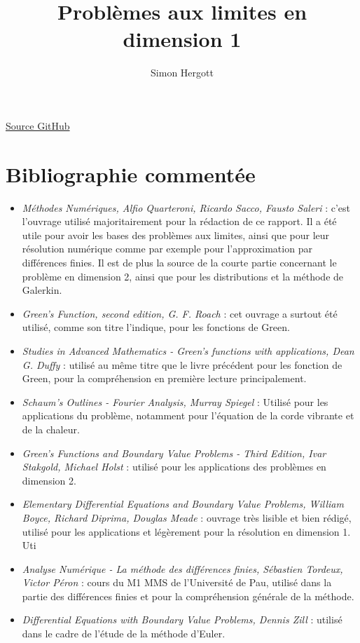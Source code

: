 \documentclass[12pt]{article}
\title{Problèmes aux limites en dimension 1} %
\author{Simon Hergott} %
\begin{document}
	\maketitle
\begin{center}
\href{https://github.com/FumedSaumonSauvage/TIPEpbLimDim1}{Source GitHub}
\end{center}


\pagebreak

\tableofcontents

\pagebreak

\section{Bibliographie commentée}


\begin{itemize}
  \item[] \emph{Méthodes Numériques, Alfio Quarteroni, Ricardo Sacco, Fausto Saleri} : c'est l'ouvrage utilisé majoritairement pour la rédaction de ce rapport. Il a été utile pour avoir les bases des problèmes aux limites, ainsi que pour leur résolution numérique comme par exemple pour l'approximation par différences finies. Il est de plus la source de la courte partie concernant le problème en dimension 2, ainsi que pour les distributions et la méthode de Galerkin.
  \item[] \emph{Green's Function, second edition, G. F. Roach} : cet ouvrage a surtout été utilisé, comme son titre l'indique, pour les fonctions de Green.
  \item[] \emph{Studies in Advanced Mathematics - Green's functions with applications,  Dean G. Duffy} : utilisé au même titre que le livre précédent pour les fonction de Green, pour la compréhension en première lecture principalement.
  \item[] \emph{Schaum's Outlines - Fourier Analysis, Murray Spiegel} : Utilisé pour les applications du problème, notamment pour l'équation de la corde vibrante et de la chaleur.
  \item[] \emph{Green's Functions and Boundary Value Problems - Third Edition, Ivar Stakgold, Michael Holst} : utilisé pour les applications des problèmes en dimension 2.
  \item[] \emph{Elementary Differential Equations and Boundary Value Problems, William Boyce, Richard Diprima, Douglas Meade} : ouvrage très lisible et bien rédigé, utilisé pour les applications et légèrement pour la résolution en dimension 1. Uti
  \item[] \emph{Analyse Numérique - La méthode des différences finies, Sébastien Tordeux, Victor Péron} : cours du M1 MMS de l'Université de Pau, utilisé dans la partie des différences finies et pour la compréhension générale de la méthode.
\item[] \emph{Differential Equations with Boundary Value Problems, Dennis Zill} : utilisé dans le cadre de l'étude de la méthode d'Euler.
\end{itemize}
	
\end{document}
